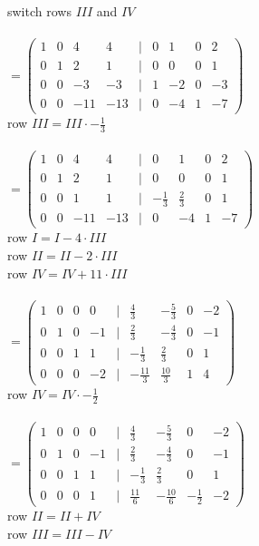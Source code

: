 switch rows $III$ and $IV$\\\\
$=
\begin{pmatrix}
1 & 0 & 4 & 4 & | & 0 & 1 & 0 & 2 \\
0 & 1 & 2 & 1 & | & 0 & 0 & 0 & 1 \\
0 & 0 & -3 & -3 & | & 1 & -2 & 0 & -3 \\
0 & 0 & -11 & -13 & | & 0 & -4 & 1 & -7
\end{pmatrix}$\\
row $III = III \cdot -\frac{1}{3}$\\\\
$=
\begin{pmatrix}
1 & 0 & 4 & 4 & | & 0 & 1 & 0 & 2 \\
0 & 1 & 2 & 1 & | & 0 & 0 & 0 & 1 \\
0 & 0 & 1 & 1 & | & -\frac{1}{3} & \frac{2}{3} & 0 & 1 \\
0 & 0 & -11 & -13 & | & 0 & -4 & 1 & -7
\end{pmatrix}$\\
row $I = I - 4\cdot III$\\
row $II = II - 2\cdot III$\\
row $IV = IV + 11\cdot III$\\\\
$=
\begin{pmatrix}
1 & 0 & 0 & 0 & | & \frac{4}{3} & -\frac{5}{3} & 0 & -2 \\
0 & 1 & 0 & -1 & | & \frac{2}{3} & -\frac{4}{3} & 0 & -1 \\
0 & 0 & 1 & 1 & | & -\frac{1}{3} & \frac{2}{3} & 0 & 1 \\
0 & 0 & 0 & -2 & | & -\frac{11}{3} & \frac{10}{3} & 1 & 4
\end{pmatrix}$\\
row $IV = IV \cdot -\frac{1}{2}$\\\\
$=
\begin{pmatrix}
1 & 0 & 0 & 0 & | & \frac{4}{3} & -\frac{5}{3} & 0 & -2 \\
0 & 1 & 0 & -1 & | & \frac{2}{3} & -\frac{4}{3} & 0 & -1 \\
0 & 0 & 1 & 1 & | & -\frac{1}{3} & \frac{2}{3} & 0 & 1 \\
0 & 0 & 0 & 1 & | & \frac{11}{6} & -\frac{10}{6} & -\frac{1}{2} & -2
\end{pmatrix}$\\
row $II = II + IV$\\
row $III = III - IV$\\\\
